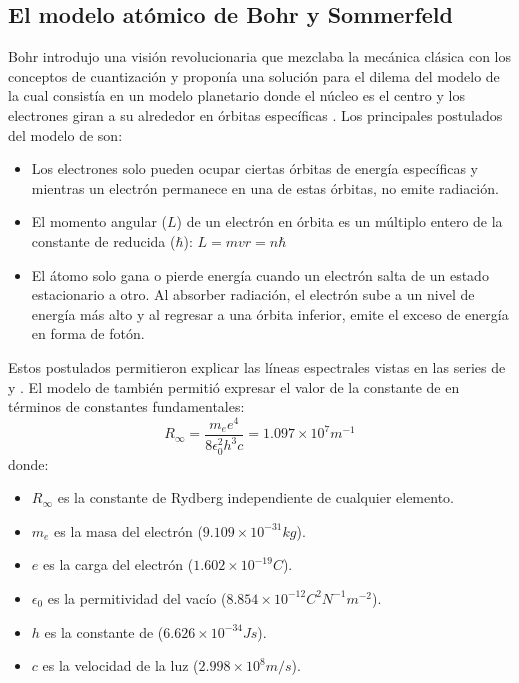 \documentclass[11pt,a4paper,spanish]{book}
\begin{document}
\subsection{El modelo atómico de Bohr y Sommerfeld}
Bohr introdujo una visión revolucionaria que mezclaba la
mecánica clásica con los conceptos
de cuantización y proponía una solución para el dilema del modelo de
\citet{rutherford1911} la cual consistía en un modelo planetario
donde el núcleo es el centro y los electrones giran a su alrededor en
órbitas específicas \citep{bohr1913}. Los principales postulados del
modelo de \citet{bohr1913} son:
\begin{itemize}[nosep]
  \item Los electrones solo pueden ocupar ciertas órbitas de energía
    específicas y mientras un electrón permanece en una de estas
    órbitas, no emite radiación.
  \item El momento angular ($L$) de un electrón en órbita es un
    múltiplo entero de la constante de \citet{planck1900} reducida
    ($\hbar$): $L = mvr = n\hbar$
  \item El átomo solo gana o pierde energía cuando un electrón salta
    de un estado estacionario a otro. Al absorber radiación, el
    electrón sube a un nivel de energía más alto y al regresar a una
    órbita inferior, emite el exceso de energía en forma de fotón.
\end{itemize}
\vspace{8pt}
Estos postulados permitieron explicar las líneas espectrales vistas
en las series de \citet{balmer1885} y \citet{lyman1906}.
El modelo de \citet{bohr1913} también permitió expresar el valor de
la constante de
\citet{rydberg1890} en términos de constantes fundamentales:
\begin{equation}
  R_{\infty} = \frac{m_e e^4}{8 \epsilon_0^2 h^3 c} = {1.097 \times
  10^{7}}{m^{-1}}
\end{equation}
donde:
\begin{itemize}[nosep]
  \item $R_{\infty}$ es la constante de Rydberg independiente de
    cualquier elemento.
  \item $m_e$ es la masa del electrón (${9.109 \times 10^{-31}}{kg}$).
  \item $e$ es la carga del electrón (${1.602 \times 10^{-19}}{C}$).
  \item $\epsilon_0$ es la permitividad del vacío (${8.854 \times
    10^{-12}}{C^2 N^{-1} m^{-2}}$).
  \item $h$ es la constante de \citet{planck1900} (${6.626 \times
    10^{-34}}{J s}$).
  \item $c$ es la velocidad de la luz (${2.998 \times 10^{8}}{m/s}$).
\end{itemize}
\end{document}
